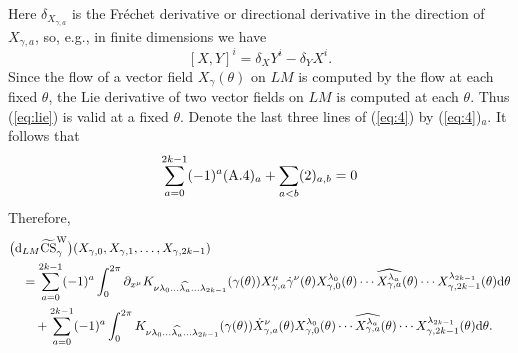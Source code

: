 \documentclass[pdftex]{sigma}
\numberwithin{equation}{section}
\theoremstyle{definition}
\newcommand{\bm}{ M}
\newcommand{\ocs}{\widetilde{{\rm CS}}}
\begin{document}
Here $\delta_{X_{\gamma,a}}$ is the Fr\'echet derivative or directional derivative in the direction of $X_{\gamma,a}$, so, e.g., in finite dimensions we have
\begin{equation}\label{eq:lie}[X,Y]^i = \delta_XY^i - \delta_YX^i.
\end{equation}
 Since the flow of a vector field $X_\gamma(\theta)$ on $LM$ is computed by the flow at each fixed $\theta$, the Lie derivative of two vector fields on $LM$ is computed at each $\theta$.
Thus (\ref{eq:lie}) is valid at a fixed $\theta$. Denote the last three lines of (\ref{eq:4}) by (\ref{eq:4})${}_a$. It follows that
\begin{equation*}
 \sum_{a=0}^{2k-1} (-1)^a ({\rm A.4})_a
 + \sum_{a<b} (2)_{a,b} =0
\end{equation*}
Therefore,
\begin{align*}
&\bigl( {\rm d}_{L\bm} \ocs^{\rm W}_\gamma \bigr)
 (X_{\gamma ,0}, X_{\gamma ,1},\dots, X_{\gamma ,2k-1} ) \\
&\quad= \sum_{a=0}^{2k-1} (-1)^a
\int_{0}^{2\pi}
 \partial_{x^\mu} K_{\nu \lambda_0 \dots \widehat{\lambda_a}\dots\lambda_{2k-1}}
(\gamma(\theta))
X_{\gamma, a}^{\mu} \dot{\gamma}^\nu (\theta)
X_{\gamma ,0}^{\lambda_0 } (\theta)
\cdots \widehat{X_{\gamma ,a}^{\lambda_a}}(\theta)\cdots
X_{\gamma ,2k-1}^{\lambda_{2k-1} } (\theta)
 {\rm d}\theta \nonumber\\
&\qquad{} +\sum_{a=0}^{2k-1} (-1)^a
\int_{0}^{2\pi}
K_{\nu \lambda_0 \dots \widehat{\lambda_a}\dots \lambda_{2k-1}} (\gamma (\theta) )
\dot{X}_{\gamma ,a}^\nu (\theta )
X_{\gamma ,0}^{\lambda_0 } (\theta)
\cdots\widehat{X_{\gamma ,a}^{\lambda_a}}(\theta) \cdots
X_{\gamma ,2k-1}^{\lambda_{2k-1} } (\theta) {\rm d}\theta.
\end{align*}
\end{document}
